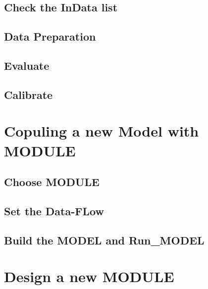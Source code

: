 \documentclass[
]{book}
\begin{document}
\hypertarget{check-the-indata-list}{%
\subsection{Check the InData list}\label{check-the-indata-list}}

\hypertarget{data-preparation}{%
\subsection{Data Preparation}\label{data-preparation}}

\hypertarget{evaluate}{%
\subsection{Evaluate}\label{evaluate}}

\hypertarget{calibrate}{%
\subsection{Calibrate}\label{calibrate}}

\hypertarget{copuling-a-new-model-with-module}{%
\section{Copuling a new Model with MODULE}\label{copuling-a-new-model-with-module}}

\hypertarget{choose-module}{%
\subsection{Choose MODULE}\label{choose-module}}

\hypertarget{set-the-data-flow}{%
\subsection{Set the Data-FLow}\label{set-the-data-flow}}

\hypertarget{build-the-model-and-run_model}{%
\subsection{Build the MODEL and Run\_MODEL}\label{build-the-model-and-run_model}}

\hypertarget{design-a-new-module}{%
\section{Design a new MODULE}\label{design-a-new-module}}
\end{document}
